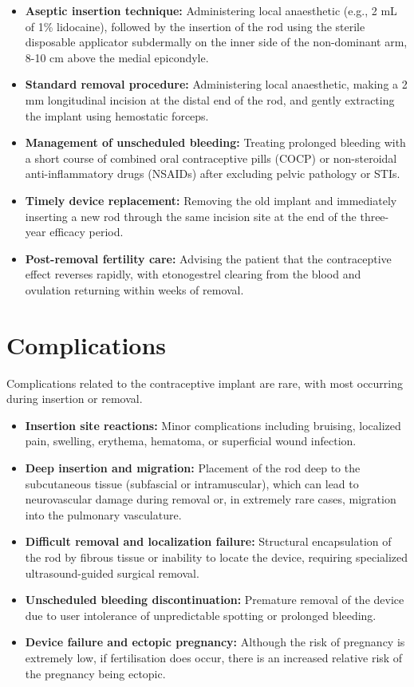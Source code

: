 \begin{itemize}
    \item \textbf{Aseptic insertion technique:} Administering local anaesthetic (e.g., 2 mL of 1\% lidocaine), followed by the insertion of the rod using the sterile disposable applicator subdermally on the inner side of the non-dominant arm, 8-10 cm above the medial epicondyle.
    \item \textbf{Standard removal procedure:} Administering local anaesthetic, making a 2 mm longitudinal incision at the distal end of the rod, and gently extracting the implant using hemostatic forceps.
    \item \textbf{Management of unscheduled bleeding:} Treating prolonged bleeding with a short course of combined oral contraceptive pills (COCP) or non-steroidal anti-inflammatory drugs (NSAIDs) after excluding pelvic pathology or STIs.
    \item \textbf{Timely device replacement:} Removing the old implant and immediately inserting a new rod through the same incision site at the end of the three-year efficacy period.
    \item \textbf{Post-removal fertility care:} Advising the patient that the contraceptive effect reverses rapidly, with etonogestrel clearing from the blood and ovulation returning within weeks of removal.
\end{itemize}

\section*{Complications}
Complications related to the contraceptive implant are rare, with most occurring during insertion or removal.

\begin{itemize}
    \item \textbf{Insertion site reactions:} Minor complications including bruising, localized pain, swelling, erythema, hematoma, or superficial wound infection.
    \item \textbf{Deep insertion and migration:} Placement of the rod deep to the subcutaneous tissue (subfascial or intramuscular), which can lead to neurovascular damage during removal or, in extremely rare cases, migration into the pulmonary vasculature.
    \item \textbf{Difficult removal and localization failure:} Structural encapsulation of the rod by fibrous tissue or inability to locate the device, requiring specialized ultrasound-guided surgical removal.
    \item \textbf{Unscheduled bleeding discontinuation:} Premature removal of the device due to user intolerance of unpredictable spotting or prolonged bleeding.
    \item \textbf{Device failure and ectopic pregnancy:} Although the risk of pregnancy is extremely low, if fertilisation does occur, there is an increased relative risk of the pregnancy being ectopic.
\end{itemize}


